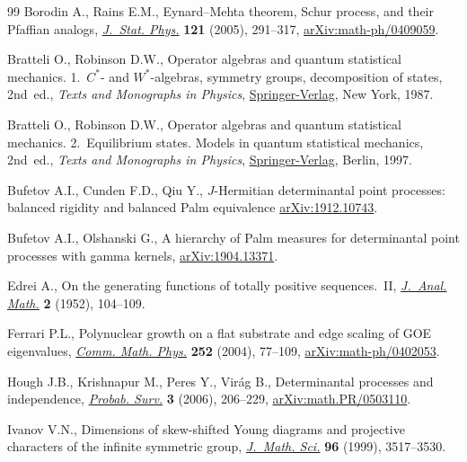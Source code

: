 \documentclass[pdftex]{sigma}
\numberwithin{equation}{section}
\begin{document}
\begin{thebibliography}{99}
Borodin A., Rains E.M., Eynard--{M}ehta theorem, {S}chur process, and their
 {P}faffian analogs, \href{https://doi.org/10.1007/s10955-005-7583-z}{\textit{J.~Stat. Phys.}} \textbf{121} (2005), 291--317,
 \href{https://arxiv.org/abs/math-ph/0409059}{arXiv:math-ph/0409059}.

Bratteli O., Robinson D.W., Operator algebras and quantum statistical
 mechanics. 1.~$C^\ast$- and $W^\ast$-algebras, symmetry groups, decomposition
 of states, 2nd~ed., \textit{Texts and Monographs in Physics}, \href{https://doi.org/10.1007/978-3-662-02520-8}{Springer-Verlag}, New
 York, 1987.

Bratteli O., Robinson D.W., Operator algebras and quantum statistical
 mechanics. 2.~Equilibrium states. Models in quantum statistical mechanics,
 2nd~ed., \textit{Texts and Monographs in Physics}, \href{https://doi.org/10.1007/978-3-662-03444-6}{Springer-Verlag}, Berlin, 1997.

Bufetov A.I., Cunden F.D., Qiu Y., {$J$}-{H}ermitian determinantal point
 processes: balanced rigidity and balanced {P}alm equivalence
 \href{https://arxiv.org/abs/1912.10743}{arXiv:1912.10743}.

Bufetov A.I., Olshanski G., A hierarchy of {P}alm measures for determinantal
 point processes with gamma kernels, \href{https://arxiv.org/abs/1904.13371}{arXiv:1904.13371}.

Edrei A., On the generating functions of totally positive sequences.~{II},
 \href{https://doi.org/10.1007/BF02786971}{\textit{J.~Anal. Math.}} \textbf{2} (1952), 104--109.

Ferrari P.L., Polynuclear growth on a flat substrate and edge scaling of {GOE}
 eigenvalues, \href{https://doi.org/10.1007/s00220-004-1204-6}{\textit{Comm. Math. Phys.}} \textbf{252} (2004), 77--109,
 \href{https://arxiv.org/abs/math-ph/0402053}{arXiv:math-ph/0402053}.

Hough J.B., Krishnapur M., Peres Y., Vir\'ag B., Determinantal processes and
 independence, \href{https://doi.org/10.1214/154957806000000078}{\textit{Probab. Surv.}} \textbf{3} (2006), 206--229,
 \href{https://arxiv.org/abs/math.PR/0503110}{arXiv:math.PR/0503110}.

Ivanov V.N., Dimensions of skew-shifted {Y}oung diagrams and projective
 characters of the infinite symmetric group, \href{https://doi.org/10.1007/BF02175830}{\textit{J.~Math. Sci.}}
 \textbf{96} (1999), 3517--3530.


\end{thebibliography}
\end{document}
